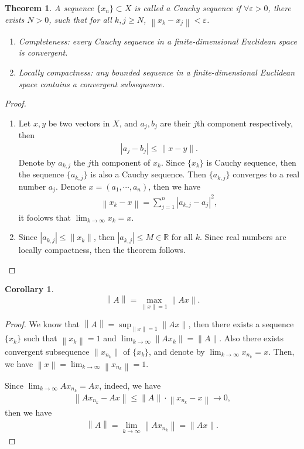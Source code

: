 \documentclass[11pt]{book}
\newtheorem{theorem}{Theorem}[chapter]
\newtheorem{corollary}{Corollary}[theorem]
\theoremstyle{definition}
\numberwithin{equation}{chapter}
\begin{document}
\begin{theorem}\label{cauchy_sequence_eclidean_theorem}
A sequence $\{x_n\}\subset X$ is called a Cauchy sequence if $\forall \varepsilon > 0$, there exists $N > 0$,  such that for all $k, j \geq N$, $\left\|x_k - x_j\right\| < \varepsilon$. 
\begin{enumerate}[label=(\alph*)]
    \item Completeness: every Cauchy sequence in a finite-dimensional Euclidean space is convergent.
    \item Locally compactness: any bounded sequence in a finite-dimensional Euclidean space contains a convergent subsequence. 
\end{enumerate}
\end{theorem}
\begin{proof}
~\begin{enumerate}[label=(\alph*)]
    \item Let $x,y$ be two vectors in $X$, and $a_j, b_j$ are their $j$th component respectively, then 
    \begin{align*}
        \left|a_j - b_j\right| \leq \|x - y\|.
    \end{align*}
    Denote by $a_{k,j}$ the $j$th component of $x_k$. Since $\{x_k\}$ is Cauchy sequence, then the sequence $\{a_{k,j}\}$ is also a Cauchy sequence. Then $\{a_{k,j}\}$ converges to a real number $a_j$. Denote $x = (a_1, \cdots, a_n)$, then we have 
    \begin{align*}
        \left\|x_k - x\right\| = \sum^n_{j=1} \left|a_{k,j} - a_j\right|^2,
    \end{align*}
    it foolows that $\lim_{k\to\infty} x_k = x$.
    \item Since $\left|a_{k,j}\right| \leq \|x_k\|$, then $\left|a_{k,j}\right| \leq M \in\mathbb{R}$ for all $k$. Since real numbers are locally compactness, then the theorem follows.
\end{enumerate}

\end{proof}

\medskip

\begin{corollary}
$$\left\|A\right\| = \max_{\|x\| = 1} \|Ax\|.$$
\end{corollary}
\begin{proof}
We know that $\left\|A\right\| = \sup_{\|x\| = 1} \|Ax\|$, then there exists a sequence $\{x_k\}$ such that $\left\|x_k\right\| = 1$ and $\lim_{k\to\infty} \left\|Ax_k\right\| = \|A\|$. Also there exists convergent subsequence $\|x_{n_k}\|$ of $\{x_k\}$, and denote by $\lim_{k\to\infty} x_{n_k} = x$. Then, we have $\left\|x\right\| = \lim_{k\to\infty} \left\|x_{n_k}\right\| = 1$. 

Since $\lim_{k\to\infty} Ax_{n_k} = Ax$, indeed, we have
\begin{align*}
    \left\|Ax_{n_k} - Ax\right\| \leq \|A\| \cdot \left\|x_{n_k} - x\right\| \to 0,
\end{align*}
then we have 
\begin{align*}
    \left\|A\right\| = \lim_{k\to\infty} \left\|Ax_{n_k}\right\| = \|Ax\|.
\end{align*}
\end{proof}
\end{document}
